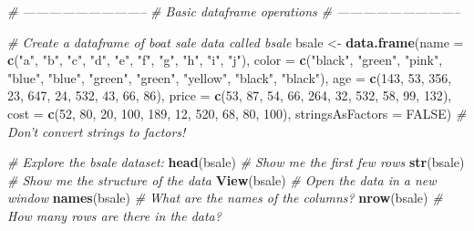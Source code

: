 \documentclass[]{book}
\newenvironment{Shaded}{\begin{snugshade}}{\end{snugshade}}
\newcommand{\KeywordTok}[1]{\textcolor[rgb]{0.13,0.29,0.53}{\textbf{#1}}}
\newcommand{\DataTypeTok}[1]{\textcolor[rgb]{0.13,0.29,0.53}{#1}}
\newcommand{\DecValTok}[1]{\textcolor[rgb]{0.00,0.00,0.81}{#1}}
\newcommand{\StringTok}[1]{\textcolor[rgb]{0.31,0.60,0.02}{#1}}
\newcommand{\CommentTok}[1]{\textcolor[rgb]{0.56,0.35,0.01}{\textit{#1}}}
\newcommand{\OtherTok}[1]{\textcolor[rgb]{0.56,0.35,0.01}{#1}}
\newcommand{\NormalTok}[1]{#1}
\theoremstyle{definition}
\theoremstyle{definition}
\theoremstyle{remark}
\begin{document}
\begin{Shaded}
\begin{Highlighting}[]
\CommentTok{# -----------------------------}
\CommentTok{# Basic dataframe operations}
\CommentTok{# -----------------------------}

\CommentTok{# Create a dataframe of boat sale data called bsale}
\NormalTok{bsale <-}\StringTok{ }\KeywordTok{data.frame}\NormalTok{(}\DataTypeTok{name =} \KeywordTok{c}\NormalTok{(}\StringTok{"a"}\NormalTok{, }\StringTok{"b"}\NormalTok{, }\StringTok{"c"}\NormalTok{, }\StringTok{"d"}\NormalTok{, }\StringTok{"e"}\NormalTok{, }\StringTok{"f"}\NormalTok{, }\StringTok{"g"}\NormalTok{, }\StringTok{"h"}\NormalTok{, }\StringTok{"i"}\NormalTok{, }\StringTok{"j"}\NormalTok{),}
                    \DataTypeTok{color =} \KeywordTok{c}\NormalTok{(}\StringTok{"black"}\NormalTok{, }\StringTok{"green"}\NormalTok{, }\StringTok{"pink"}\NormalTok{, }\StringTok{"blue"}\NormalTok{, }\StringTok{"blue"}\NormalTok{, }
                              \StringTok{"green"}\NormalTok{, }\StringTok{"green"}\NormalTok{, }\StringTok{"yellow"}\NormalTok{, }\StringTok{"black"}\NormalTok{, }\StringTok{"black"}\NormalTok{),}
                    \DataTypeTok{age =} \KeywordTok{c}\NormalTok{(}\DecValTok{143}\NormalTok{, }\DecValTok{53}\NormalTok{, }\DecValTok{356}\NormalTok{, }\DecValTok{23}\NormalTok{, }\DecValTok{647}\NormalTok{, }\DecValTok{24}\NormalTok{, }\DecValTok{532}\NormalTok{, }\DecValTok{43}\NormalTok{, }\DecValTok{66}\NormalTok{, }\DecValTok{86}\NormalTok{),}
                    \DataTypeTok{price =} \KeywordTok{c}\NormalTok{(}\DecValTok{53}\NormalTok{, }\DecValTok{87}\NormalTok{, }\DecValTok{54}\NormalTok{, }\DecValTok{66}\NormalTok{, }\DecValTok{264}\NormalTok{, }\DecValTok{32}\NormalTok{, }\DecValTok{532}\NormalTok{, }\DecValTok{58}\NormalTok{, }\DecValTok{99}\NormalTok{, }\DecValTok{132}\NormalTok{),}
                    \DataTypeTok{cost =} \KeywordTok{c}\NormalTok{(}\DecValTok{52}\NormalTok{, }\DecValTok{80}\NormalTok{, }\DecValTok{20}\NormalTok{, }\DecValTok{100}\NormalTok{, }\DecValTok{189}\NormalTok{, }\DecValTok{12}\NormalTok{, }\DecValTok{520}\NormalTok{, }\DecValTok{68}\NormalTok{, }\DecValTok{80}\NormalTok{, }\DecValTok{100}\NormalTok{),}
                    \DataTypeTok{stringsAsFactors =} \OtherTok{FALSE}\NormalTok{)   }\CommentTok{# Don't convert strings to factors!}

\CommentTok{# Explore the bsale dataset:}
\KeywordTok{head}\NormalTok{(bsale)     }\CommentTok{# Show me the first few rows}
\KeywordTok{str}\NormalTok{(bsale)      }\CommentTok{# Show me the structure of the data}
\KeywordTok{View}\NormalTok{(bsale)     }\CommentTok{# Open the data in a new window}
\KeywordTok{names}\NormalTok{(bsale)    }\CommentTok{# What are the names of the columns?}
\KeywordTok{nrow}\NormalTok{(bsale)     }\CommentTok{# How many rows are there in the data?}


\end{Highlighting}
\end{Shaded}
\end{document}
